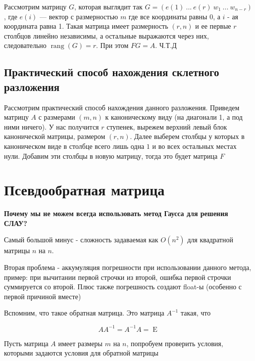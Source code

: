\documentclass{article}
\begin{document}
    Рассмотрим матрицу $G$, которая выглядит так $G = (e(1) \ ... \ e(r) \ w_{1} \ ... \ w_{n - r})$, где
    $e(i)$ --- вектор с размерностью $m$ где все координаты равны $0$, а $i$ - ая координата равна 1.
    Такая матрица имеет размерность $(r, n)$ и ее первые $r$ столбцов линейно независимы, а остальные выражаются через них, следовательно
    $\operatorname{rang}(G) = r$.
    При этом $FG = A$.
    Ч.Т.Д

    \subsection{Практический способ нахождения склетного разложения}

    Рассмотрим практический способ нахождения данного разложения.
    Приведем матрицу $A$ с размерами $(m, n)$ к каноническому виду (на диагонали 1, а под ними ничего).
    У нас получится $r$ ступенек, вырежем верхний левый блок канонической матрицы, размером
    $(r, n)$.
    Далее выберем столбцы у которых в каноническом виде в столбце всего лишь одна $1$ и во всех остальных местах нули.
    Добавим эти столбцы в новую матрицу, тогда это будет матрица $F$





    \section{Псевдообратная матрица}
    
    \textbf{Почему мы не можем всегда использовать метод Гаусса для решения СЛАУ?}

    \quad

    Самый большой минус - сложность задаваемая как $O(n ^ {2})$ для квадратной матрицы $n$ на $n$.

    Вторая проблема - аккумуляция погрешности при использовании данного метода, пример: при вычитании первой строчки из второй, ошибка первой строчки суммируется со второй.
    Плюс также погрешность создают float-ы (особенно с первой причиной вместе)

    \quad 

    Вспомним, что такое обратная матрица.
    Это матрица $A^{-1}$ такая, что

    \begin{equation}
        A A^{-1} = A^{-1} A = \operatorname{E}
    \end{equation}

    Пусть матрица $A$ имеет размеры $m$ на $n$, попробуем проверить условия, которыми задаются условия для обратной матрицы
\end{document}
